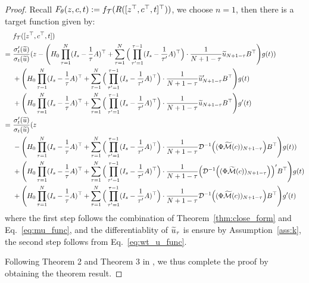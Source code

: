 \begin{proof}
    Recall $F_\theta(z, c, t) := f_{\cal T}( R([z^\top, c^\top, t]^\top) )$, we choose $n=1$, then there is a target function given by:
    \begin{align*}
        &  ~ f_{\cal T}([z^\top, c^\top, t]) \\
        = & ~ \frac{\sigma_t'(\widetilde{u})}{\sigma_t(\widetilde{u})} ( z - \Bigg( H_0 \prod_{\tau=1}^N (I_s - \frac{1}{\tau}A)^\top + \sum_{\tau=1}^N \Big( \prod_{\tau'=1}^{\tau - 1} (I_s - \frac{1}{\tau'} A )^\top\Big) \cdot \frac{1}{N+1-\tau} \widetilde{u}_{N+1-\tau} B^\top \Bigg) g(t)  ) \\
        & ~ + \Bigg( H_0 \prod_{\tau=1}^N (I_s - \frac{1}{\tau}A)^\top + \sum_{\tau=1}^N \Big( \prod_{\tau'=1}^{\tau - 1} (I_s - \frac{1}{\tau'} A )^\top\Big) \cdot \frac{1}{N+1-\tau} \widetilde{u}_{N+1-\tau}' B^\top \Bigg) g(t) \\
        & ~ + \Bigg( H_0 \prod_{\tau=1}^N (I_s - \frac{1}{\tau}A)^\top + \sum_{\tau=1}^N \Big( \prod_{\tau'=1}^{\tau - 1} (I_s - \frac{1}{\tau'} A )^\top\Big) \cdot \frac{1}{N+1-\tau} \widetilde{u}_{N+1-\tau} B^\top \Bigg) g'(t) \\
        = & ~ \frac{\sigma_t'(\widetilde{u})}{\sigma_t(\widetilde{u})} ( z \\ 
        & ~ - \Bigg( H_0 \prod_{\tau=1}^N (I_s - \frac{1}{\tau}A)^\top + \sum_{\tau=1}^N \Big( \prod_{\tau'=1}^{\tau - 1} (I_s - \frac{1}{\tau'} A )^\top\Big) \cdot \frac{1}{N+1-\tau} {\cal D}^{-1}\Big( (\Phi \widetilde{{\cal M}}(c))_{N+1-\tau} \Big) B^\top \Bigg) g(t)  ) \\
        & ~ + \Bigg( H_0 \prod_{\tau=1}^N (I_s - \frac{1}{\tau}A)^\top + \sum_{\tau=1}^N \Big( \prod_{\tau'=1}^{\tau - 1} (I_s - \frac{1}{\tau'} A )^\top\Big) \cdot \frac{1}{N+1-\tau} \Big({\cal D}^{-1}\Big( (\Phi \widetilde{{\cal M}}(c))_{N+1-\tau} \Big) \Big)' B^\top \Bigg) g(t) \\
        & ~ + \Bigg( H_0 \prod_{\tau=1}^N (I_s - \frac{1}{\tau}A)^\top + \sum_{\tau=1}^N \Big( \prod_{\tau'=1}^{\tau - 1} (I_s - \frac{1}{\tau'} A )^\top\Big) \cdot \frac{1}{N+1-\tau} {\cal D}^{-1}\Big( (\Phi \widetilde{{\cal M}}(c))_{N + 1 - \tau} \Big) B^\top \Bigg) g'(t)
    \end{align*}
    where the first step follows the combination of Theorem~\ref{thm:close_form} and Eq.~\eqref{eq:mu_func}, and the differentiablity of $\widetilde{u}_\tau$ is ensure by Assumption~\ref{ass:k}, the second step follows from Eq.~\eqref{eq:wt_u_func}.

    Following Theorem 2 and Theorem 3 in \cite{ybr+19}, we thus complete the proof by obtaining the theorem result.
\end{proof}
